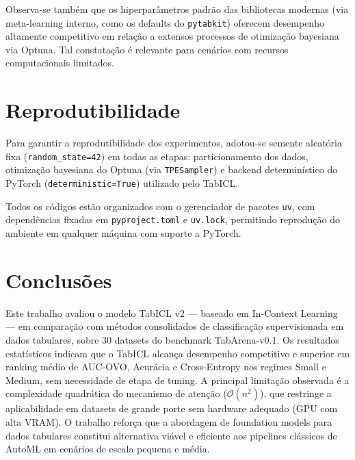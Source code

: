 \documentclass[12pt,a4paper]{article}
\begin{document}
Observa-se também que os hiperparâmetros padrão das bibliotecas modernas (via meta-learning interno, como os defaults do \texttt{pytabkit}) oferecem desempenho altamente competitivo em relação a extensos processos de otimização bayesiana via Optuna. Tal constatação é relevante para cenários com recursos computacionais limitados.

\section{Reprodutibilidade}
Para garantir a reprodutibilidade dos experimentos, adotou-se semente aleatória fixa (\texttt{random\_state=42}) em todas as etapas: particionamento dos dados, otimização bayesiana do Optuna (via \texttt{TPESampler}) e backend determinístico do PyTorch (\texttt{deterministic=True}) utilizado pelo TabICL.

Todos os códigos estão organizados com o gerenciador de pacotes \texttt{uv}, com dependências fixadas em \texttt{pyproject.toml} e \texttt{uv.lock}, permitindo reprodução do ambiente em qualquer máquina com suporte a PyTorch.

\section{Conclusões}
Este trabalho avaliou o modelo TabICL v2 — baseado em In-Context Learning — em comparação com métodos consolidados de classificação supervisionada em dados tabulares, sobre 30 datasets do benchmark TabArena-v0.1. Os resultados estatísticos indicam que o TabICL alcança desempenho competitivo e superior em ranking médio de AUC-OVO, Acurácia e Cross-Entropy nos regimes Small e Medium, sem necessidade de etapa de tuning. A principal limitação observada é a complexidade quadrática do mecanismo de atenção ($\mathcal{O}(n^2)$), que restringe a aplicabilidade em datasets de grande porte sem hardware adequado (GPU com alta VRAM). O trabalho reforça que a abordagem de foundation models para dados tabulares constitui alternativa viável e eficiente aos pipelines clássicos de AutoML em cenários de escala pequena e média.

\clearpage
\appendix
\end{document}
